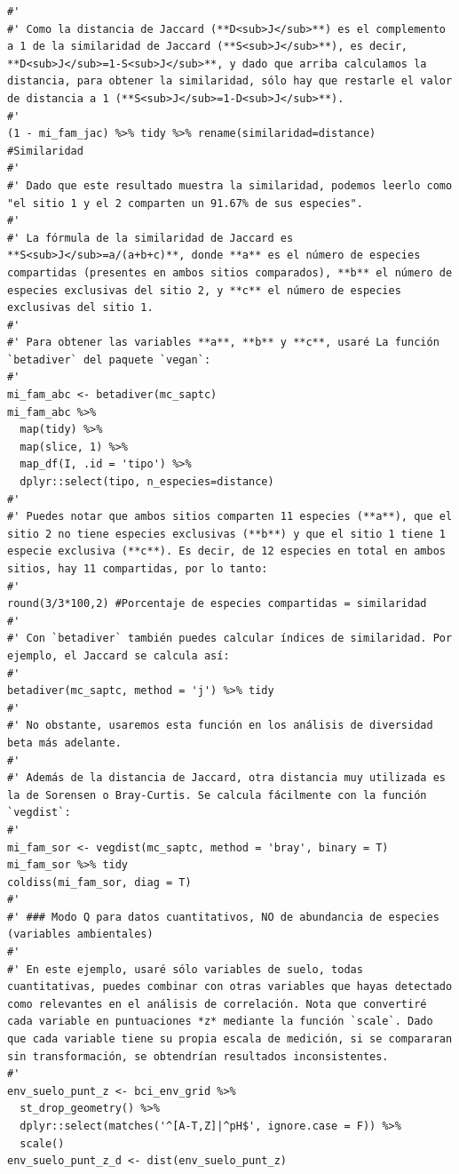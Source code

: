 \documentclass[11pt,]{article}
\begin{document}
\begin{verbatim}
#' 
#' Como la distancia de Jaccard (**D<sub>J</sub>**) es el complemento a 1 de la similaridad de Jaccard (**S<sub>J</sub>**), es decir, **D<sub>J</sub>=1-S<sub>J</sub>**, y dado que arriba calculamos la distancia, para obtener la similaridad, sólo hay que restarle el valor de distancia a 1 (**S<sub>J</sub>=1-D<sub>J</sub>**).
#' 
(1 - mi_fam_jac) %>% tidy %>% rename(similaridad=distance) #Similaridad
#'
#' Dado que este resultado muestra la similaridad, podemos leerlo como "el sitio 1 y el 2 comparten un 91.67% de sus especies".
#' 
#' La fórmula de la similaridad de Jaccard es **S<sub>J</sub>=a/(a+b+c)**, donde **a** es el número de especies compartidas (presentes en ambos sitios comparados), **b** el número de especies exclusivas del sitio 2, y **c** el número de especies exclusivas del sitio 1.
#' 
#' Para obtener las variables **a**, **b** y **c**, usaré La función `betadiver` del paquete `vegan`:
#' 
mi_fam_abc <- betadiver(mc_saptc) 
mi_fam_abc %>%
  map(tidy) %>%
  map(slice, 1) %>%
  map_df(I, .id = 'tipo') %>% 
  dplyr::select(tipo, n_especies=distance)
#' 
#' Puedes notar que ambos sitios comparten 11 especies (**a**), que el sitio 2 no tiene especies exclusivas (**b**) y que el sitio 1 tiene 1 especie exclusiva (**c**). Es decir, de 12 especies en total en ambos sitios, hay 11 compartidas, por lo tanto:
#' 
round(3/3*100,2) #Porcentaje de especies compartidas = similaridad
#' 
#' Con `betadiver` también puedes calcular índices de similaridad. Por ejemplo, el Jaccard se calcula así:
#' 
betadiver(mc_saptc, method = 'j') %>% tidy
#' 
#' No obstante, usaremos esta función en los análisis de diversidad beta más adelante.
#' 
#' Además de la distancia de Jaccard, otra distancia muy utilizada es la de Sorensen o Bray-Curtis. Se calcula fácilmente con la función `vegdist`:
#' 
mi_fam_sor <- vegdist(mc_saptc, method = 'bray', binary = T)
mi_fam_sor %>% tidy
coldiss(mi_fam_sor, diag = T)
#' 
#' ### Modo Q para datos cuantitativos, NO de abundancia de especies (variables ambientales)
#' 
#' En este ejemplo, usaré sólo variables de suelo, todas cuantitativas, puedes combinar con otras variables que hayas detectado como relevantes en el análisis de correlación. Nota que convertiré cada variable en puntuaciones *z* mediante la función `scale`. Dado que cada variable tiene su propia escala de medición, si se compararan sin transformación, se obtendrían resultados inconsistentes.
#' 
env_suelo_punt_z <- bci_env_grid %>%
  st_drop_geometry() %>% 
  dplyr::select(matches('^[A-T,Z]|^pH$', ignore.case = F)) %>% 
  scale()
env_suelo_punt_z_d <- dist(env_suelo_punt_z)

\end{verbatim}
\end{document}

